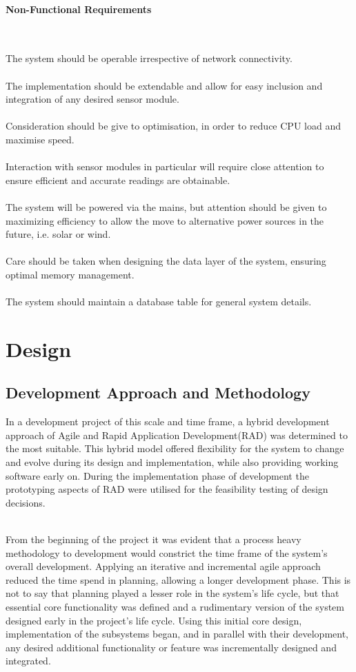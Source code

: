 \documentclass{article}
\begin{document}
\paragraph*{Non-Functional Requirements}\

The system should be operable irrespective of network connectivity. \\\\ The implementation should be extendable and allow for easy inclusion and integration of any desired sensor module. \\\\ Consideration should be give to optimisation, in order to reduce CPU load and maximise speed. \\\\ Interaction with sensor modules in particular will require close attention to ensure efficient and accurate readings are obtainable. \\\\ The system will be powered via the mains, but attention should be given to maximizing efficiency to allow the move to alternative power sources in the future, i.e. solar or wind. \\\\ Care should be taken when designing the data layer of the system, ensuring optimal memory management. \\\\ The system should maintain a database table for general system details.

\section{Design}
\subsection{Development Approach and Methodology}
In a development project of this scale and time frame, a hybrid development approach of Agile and Rapid Application Development(RAD) was determined to the most suitable. This hybrid model offered flexibility for the system to change and evolve during its design and implementation, while also providing working software early on. During the implementation phase of development the prototyping aspects of RAD were utilised for the feasibility testing of design decisions. \\\

From the beginning of the project it was evident that a process heavy methodology to development would constrict the time frame of the system’s overall development. Applying an iterative and incremental agile approach reduced the time spend in planning, allowing a longer development phase. This is not to say that planning played a lesser role in the system’s life cycle, but that essential core functionality was defined and a rudimentary version of the system designed early in the project’s life cycle. Using this initial core design, implementation of the subsystems began, and in parallel with their development, any desired additional functionality or feature was incrementally designed and integrated.
\end{document}
